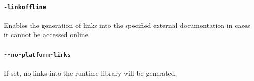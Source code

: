 \paragraph{\texttt{-linkoffline}} Enables the generation of links into the specified external documentation in cases it cannot be accessed online.

\paragraph{\texttt{-{}-no-platform-links}} If set, no links into the runtime library will be generated.


